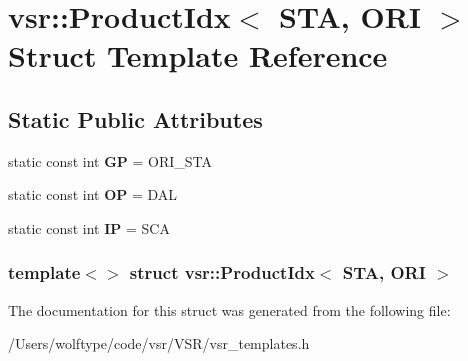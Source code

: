 \hypertarget{structvsr_1_1_product_idx_3_01_s_t_a_00_01_o_r_i_01_4}{\section{vsr\-:\-:Product\-Idx$<$ S\-T\-A, O\-R\-I $>$ Struct Template Reference}
\label{structvsr_1_1_product_idx_3_01_s_t_a_00_01_o_r_i_01_4}
}
\subsection*{Static Public Attributes}
\begin{DoxyCompactItemize}
\item 
\hypertarget{structvsr_1_1_product_idx_3_01_s_t_a_00_01_o_r_i_01_4_af2a961e8d5587a0c36519b75cff2a0a7}{static const int {\bfseries G\-P} = O\-R\-I\-\_\-\-S\-T\-A}\label{structvsr_1_1_product_idx_3_01_s_t_a_00_01_o_r_i_01_4_af2a961e8d5587a0c36519b75cff2a0a7}

\item 
\hypertarget{structvsr_1_1_product_idx_3_01_s_t_a_00_01_o_r_i_01_4_a99f6c90422555830cbe63e16309bfa0b}{static const int {\bfseries O\-P} = D\-A\-L}\label{structvsr_1_1_product_idx_3_01_s_t_a_00_01_o_r_i_01_4_a99f6c90422555830cbe63e16309bfa0b}

\item 
\hypertarget{structvsr_1_1_product_idx_3_01_s_t_a_00_01_o_r_i_01_4_aca921d8628ba57eba6563b9fed38eeab}{static const int {\bfseries I\-P} = S\-C\-A}\label{structvsr_1_1_product_idx_3_01_s_t_a_00_01_o_r_i_01_4_aca921d8628ba57eba6563b9fed38eeab}

\end{DoxyCompactItemize}
\subsubsection*{template$<$$>$ struct vsr\-::\-Product\-Idx$<$ S\-T\-A, O\-R\-I $>$}



The documentation for this struct was generated from the following file\-:\begin{DoxyCompactItemize}
\item 
/\-Users/wolftype/code/vsr/\-V\-S\-R/vsr\-\_\-templates.\-h\end{DoxyCompactItemize}
